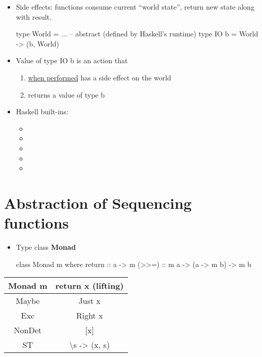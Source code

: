 \begin{itemize}
    \item Side effects: functions consume current ``world state'', return new state along with result.
\begin{codebox}[haskell]
type World = ... -- abstract (defined by Haskell's runtime)
type IO b = World -> (b, World)
\end{codebox}
    \item Value of type IO b is an action that
    \begin{enumerate}
        \item \underline{when performed} has a side effect on the world
        \item returns a value of type b
    \end{enumerate}
    \item Haskell built-ins:
    \begin{itemize}
        \item {}
        \item {}
        \item {}
        \item {}
        \item {}
    \end{itemize}
\end{itemize}


\section*{Abstraction of Sequencing functions}


\begin{itemize}
    \item Type class \textbf{Monad}
\begin{codebox}[haskell]
class Monad m where
    return :: a -> m 
    (>>=) :: m a -> (a -> m b) -> m b
\end{codebox}
\end{itemize}

\vspace{9pt}\begin{center}\begin{tabular}{|c|c|}\hline
\rowcolor{grau} Monad m             & return x (lifting)    \\\hline
                Maybe               & Just x                \\\hline
                Exc                 & Right x               \\\hline
                NonDet              & [x]                   \\\hline
                ST                  & \textbackslash s -> (x, s)          \\\hline
\end{tabular}\end{center}\vspace{9pt}

